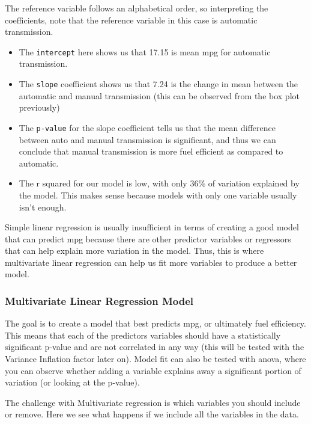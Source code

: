 \documentclass[
]{article}
\providecommand{\tightlist}{%
  \setlength{\itemsep}{0pt}\setlength{\parskip}{0pt}}
\begin{document}
The reference variable follows an alphabetical order, so interpreting
the coefficients, note that the reference variable in this case is
automatic transmission.

\begin{itemize}
\tightlist
\item
  The \texttt{intercept} here shows us that 17.15 is mean mpg for
  automatic transmission.
\item
  The \texttt{slope} coefficient shows us that 7.24 is the change in
  mean between the automatic and manual transmission (this can be
  observed from the box plot previously)
\item
  The \texttt{p-value} for the slope coefficient tells us that the mean
  difference between auto and manual transmission is significant, and
  thus we can conclude that manual transmission is more fuel efficient
  as compared to automatic.
\item
  The r squared for our model is low, with only 36\% of variation
  explained by the model. This makes sense because models with only one
  variable usually isn't enough.
\end{itemize}

Simple linear regression is usually insufficient in terms of creating a
good model that can predict mpg because there are other predictor
variables or regressors that can help explain more variation in the
model. Thus, this is where multivariate linear regression can help us
fit more variables to produce a better model.

\hypertarget{multivariate-linear-regression-model}{%
\subsubsection{Multivariate Linear Regression
Model}\label{multivariate-linear-regression-model}}

The goal is to create a model that best predicts mpg, or ultimately fuel
efficiency. This means that each of the predictors variables should have
a statistically significant p-value and are not correlated in any way
(this will be tested with the Variance Inflation factor later on). Model
fit can also be tested with anova, where you can observe whether adding
a variable explains away a significant portion of variation (or looking
at the p-value).

The challenge with Multivariate regression is which variables you should
include or remove. Here we see what happens if we include all the
variables in the data.
\end{document}
